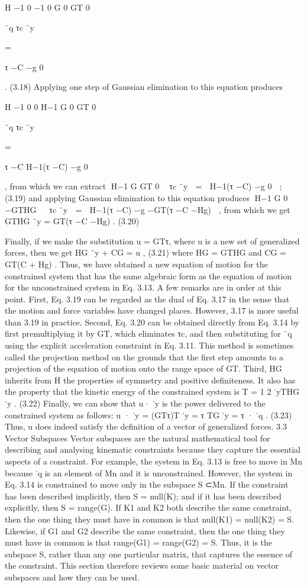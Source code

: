 H −1 0 −1 0 G 0 GT 0

¨q τc ¨y

=

τ −C −g 0

. (3.18) Applying one step of Gaussian elimination to this equation produces

H −1 0 0 H−1 G 0 GT 0

¨q τc ¨y

=

τ −C H−1(τ −C) −g 0

, from which we can extract H−1 G GT 0  τc ¨y  =  H−1(τ −C) −g 0  ; (3.19) and applying Gaussian elimination to this equation produces H−1 G 0 −GTHG   τc ¨y  =  H−1(τ −C) −g −GT(τ −C −Hg)  , from which we get GTHG ¨y = GT(τ −C −Hg) . (3.20)

Finally, if we make the substitution u = GTτ, where u is a new set of generalized forces, then we get HG ¨y + CG = u , (3.21) where HG = GTHG and CG = GT(C + Hg) . Thus, we have obtained a new equation of motion for the constrained system that has the same algebraic form as the equation of motion for the unconstrained system in Eq. 3.13. A few remarks are in order at this point. First, Eq. 3.19 can be regarded as the dual of Eq. 3.17 in the sense that the motion and force variables have changed places. However, 3.17 is more useful than 3.19 in practice. Second, Eq. 3.20 can be obtained directly from Eq. 3.14 by first premultiplying it by GT, which eliminates τc, and then substituting for ¨q using the explicit acceleration constraint in Eq. 3.11. This method is sometimes called the projection method on the grounds that the first step amounts to a projection of the equation of motion onto the range space of GT. Third, HG inherits from H the properties of symmetry and positive definiteness. It also has the property that the kinetic energy of the constrained system is T = 1 2 ˙yTHG ˙y . (3.22) Finally, we can show that u· ˙y is the power delivered to the constrained system as follows: u · ˙y = (GTτ)T ˙y = τ TG ˙y = τ · ˙q . (3.23) Thus, u does indeed satisfy the definition of a vector of generalized forces. 3.3 Vector Subspaces Vector subspaces are the natural mathematical tool for describing and analysing kinematic constraints because they capture the essential aspects of a constraint. For example, the system in Eq. 3.13 is free to move in Mn because ˙q is an element of Mn and it is unconstrained. However, the system in Eq. 3.14 is constrained to move only in the subspace S ⊂Mn. If the constraint has been described implicitly, then S = null(K); and if it has been described explicitly, then S = range(G). If K1 and K2 both describe the same constraint, then the one thing they must have in common is that null(K1) = null(K2) = S. Likewise, if G1 and G2 describe the same constraint, then the one thing they must have in common is that range(G1) = range(G2) = S. Thus, it is the subspace S, rather than any one particular matrix, that captures the essence of the constraint. This section therefore reviews some basic material on vector subspaces and how they can be used.

